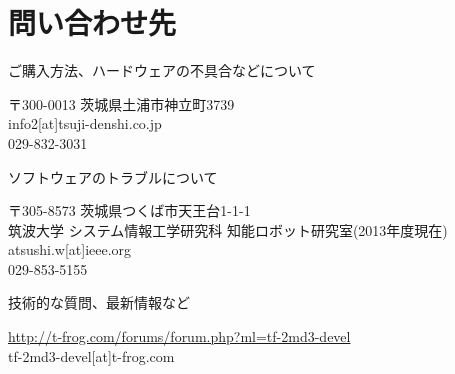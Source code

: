 \documentclass[11pt,a4j,openany]{jbook}
\begin{document}
\newpage
\section{問い合わせ先}
\label{sec:問い合わせ先}

\begin{itembox}[l]
	{ご購入方法、ハードウェアの不具合などについて}
	{
		\hspace{1em}{\bf ツジ電子株式会社}\par
		\medskip\hspace{2em}
		\parbox[H]{0.8\textwidth}{
			〒300-0013 茨城県土浦市神立町3739\\
			info2[at]tsuji-denshi.co.jp\\
			029-832-3031
		}
	}
\end{itembox}
\vspace{1em}
\begin{itembox}[l]
	{ソフトウェアのトラブルについて}
	{
		\hspace{1em}{\bf 渡辺敦志}\par
		\medskip\hspace{2em}
		\parbox[H]{0.8\textwidth}{
			〒305-8573 茨城県つくば市天王台1-1-1\\
			筑波大学 システム情報工学研究科 知能ロボット研究室(2013年度現在)\\
			atsushi.w[at]ieee.org\\
			029-853-5155
		}
	}
\end{itembox}
\vspace{1em}
\begin{itembox}[l]
	{技術的な質問、最新情報など}
	{
		\hspace{1em}{\bf T-frog プロジェクト モータドライバフォーラム (メーリングリスト)}\par
		\medskip\hspace{2em}
		\parbox[H]{0.8\textwidth}{
			\url{http://t-frog.com/forums/forum.php?ml=tf-2md3-devel}\\
			tf-2md3-devel[at]t-frog.com
		}
	}
\end{itembox}
\end{document}
